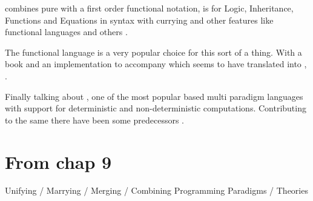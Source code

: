 \documentclass[thesis-solanki.tex]{subfiles}
\begin{document}
\cite{website:babel,moreno1992logic, moreno1988babel} combines pure  with a first order functional
notation,  \cite{website:life} is for  Logic, Inheritance, Functions and Equations in
 syntax with currying and other features like functional languages and others
\cite{bert1987lpg,malachi1984tablog}.

The functional language  is a very popular choice for this sort of a thing.
With a book \cite{friedman05reasoned} and an implementation to accompany
\cite{website:kanren,website:minkanren}\yyy{}{\Large,} 
which seems to have translated into , 
\cite{website:haskellkanren,website:molog,website:minikanrent}. 

Finally talking about , one of the most popular  based multi paradigm languages with support for deterministic and non-deterministic computations. Contributing to the same there have been some predecessors \cite{website:alf,website:toy}.       


\section{\textbf{From chap 9}}

Unifying / Marrying / Merging / Combining Programming Paradigms / Theories
\end{document}
